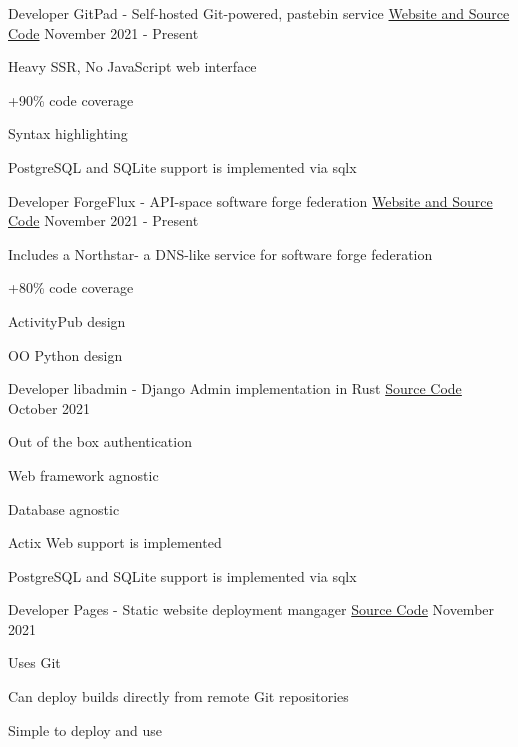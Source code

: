 
\begin{cventries}
  \cventry
	{Developer}
	{GitPad - Self-hosted Git-powered, pastebin service} 
	{\href{https://gitpad.org/}{Website and Source Code}}
	{November 2021 - Present}
	{
		\begin{cvitems}
			\item {Heavy SSR, No JavaScript web interface} 
			\item {+90\% code coverage}
			\item {Syntax highlighting}
			\item {PostgreSQL and SQLite support is implemented via sqlx}
		\end{cvitems}
	}


  \cventry
	{Developer}
	{ForgeFlux - API-space software forge federation}
	{\href{https://forgeflux.org/}{Website and Source Code}}
	{November 2021 - Present}
	{
		\begin{cvitems}
			\item {Includes a Northstar- a DNS-like service for software forge federation}
			\item {+80\% code coverage}
			\item {ActivityPub design}
			\item {OO Python design}
		\end{cvitems}
	}

  \cventry
	{Developer}
	{libadmin - Django Admin implementation in Rust}
	{\href{https://github.com/realaravinth/libadmin}{Source Code}}
	{October 2021}
	{
		\begin{cvitems}
			\item {Out of the box authentication}
			\item {Web framework agnostic}
			\item {Database agnostic}
			\item {Actix Web support is implemented}
			\item {PostgreSQL and SQLite support is implemented via sqlx}
		\end{cvitems}
	}

  \cventry
	{Developer}
	{Pages - Static website deployment mangager}
	{\href{https://github.com/realaravinth/pages}{Source Code}}
	{November 2021}
	{
		\begin{cvitems}
			\item {Uses Git}
			\item {Can deploy builds directly from remote Git repositories}
			\item {Simple to deploy and use}
		\end{cvitems}
	}


\end{cventries}

